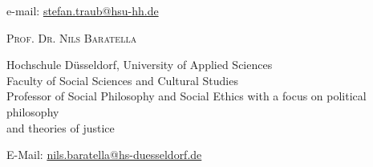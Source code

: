 \documentclass[a4paper,10pt]{article}
\begin{document}
e-mail: \href{mailto:stefan.traub@hsu-hh.de}{stefan.traub@hsu-hh.de}\vspace{12pt}

\textsc{Prof\hspace{0.5pt}. Dr\hspace{0.5pt}. Nils Baratella}

Hochschule Düsseldorf, University of Applied Sciences\\
Faculty of Social Sciences and Cultural Studies\\
Professor of Social Philosophy and Social Ethics with a focus on political philosophy\\
and theories of justice

E-Mail: \href{mailto:nils.baratella@hs-duesseldorf.de}{nils.baratella@hs-duesseldorf.de}
\end{document}
